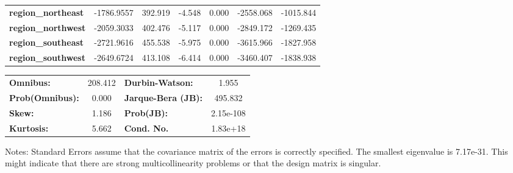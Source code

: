 \begin{center}
\begin{tabular}{lcccccc}
\textbf{region\_northeast} &   -1786.9557  &      392.919     &    -4.548  &         0.000        &    -2558.068    &    -1015.844     \\
\textbf{region\_northwest} &   -2059.3033  &      402.476     &    -5.117  &         0.000        &    -2849.172    &    -1269.435     \\
\textbf{region\_southeast} &   -2721.9616  &      455.538     &    -5.975  &         0.000        &    -3615.966    &    -1827.958     \\
\textbf{region\_southwest} &   -2649.6724  &      413.108     &    -6.414  &         0.000        &    -3460.407    &    -1838.938     \\
\bottomrule
\end{tabular}
\begin{tabular}{lclc}
\textbf{Omnibus:}       & 208.412 & \textbf{  Durbin-Watson:     } &     1.955  \\
\textbf{Prob(Omnibus):} &   0.000 & \textbf{  Jarque-Bera (JB):  } &   495.832  \\
\textbf{Skew:}          &   1.186 & \textbf{  Prob(JB):          } & 2.15e-108  \\
\textbf{Kurtosis:}      &   5.662 & \textbf{  Cond. No.          } &  1.83e+18  \\
\bottomrule
\end{tabular}
\end{center}

Notes: \newline
 [1] Standard Errors assume that the covariance matrix of the errors is correctly specified. \newline
 [2] The smallest eigenvalue is 7.17e-31. This might indicate that there are \newline
 strong multicollinearity problems or that the design matrix is singular.